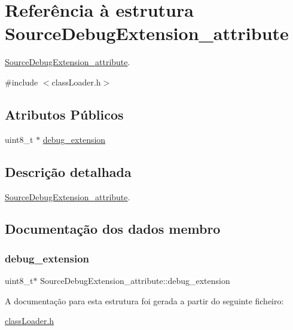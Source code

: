 \hypertarget{struct_source_debug_extension__attribute}{}\section{Referência à estrutura Source\+Debug\+Extension\+\_\+attribute}
\label{struct_source_debug_extension__attribute}


\hyperlink{struct_source_debug_extension__attribute}{Source\+Debug\+Extension\+\_\+attribute}.  




{\ttfamily \#include $<$class\+Loader.\+h$>$}

\subsection*{Atributos Públicos}
\begin{DoxyCompactItemize}
\item 
uint8\+\_\+t $\ast$ \hyperlink{struct_source_debug_extension__attribute_a0bd2aee9ec4fe8dabd3096f414da0b8a}{debug\+\_\+extension}
\end{DoxyCompactItemize}


\subsection{Descrição detalhada}
\hyperlink{struct_source_debug_extension__attribute}{Source\+Debug\+Extension\+\_\+attribute}. 

\subsection{Documentação dos dados membro}
\hypertarget{struct_source_debug_extension__attribute_a0bd2aee9ec4fe8dabd3096f414da0b8a}{}\label{struct_source_debug_extension__attribute_a0bd2aee9ec4fe8dabd3096f414da0b8a} 
\subsubsection{\texorpdfstring{debug\+\_\+extension}{debug\_extension}}
{\footnotesize\ttfamily uint8\+\_\+t$\ast$ Source\+Debug\+Extension\+\_\+attribute\+::debug\+\_\+extension}



A documentação para esta estrutura foi gerada a partir do seguinte ficheiro\+:\begin{DoxyCompactItemize}
\item 
\hyperlink{class_loader_8h}{class\+Loader.\+h}\end{DoxyCompactItemize}

